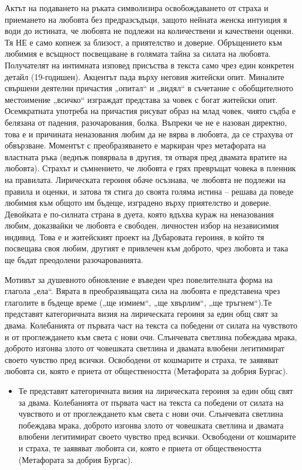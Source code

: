 \documentclass[12pt,a4paper]{article}
\begin{document}
\indent Актът на подаването на ръката символизира освобождаването от страха и приемането на любовта без предразсъдъци, защото нейната женска интуиция я води до истината, че любовта не подлежи на количествени и качествени оценки. Тя НЕ е само копнеж за близост, а приятелство и доверие. Обръщението към любимия е всъщност посвещаване в голямата тайна за силата на любовта. Получателят на интимната изповед присъства в текста само чрез един конкретен детайл (19-годишен). Акцентът пада върху неговия житейски опит. Миналите свършени деятелни причастия „опитал“ и „видял“ в съчетание с обобщителното местоимение „всичко“ изграждат представа за човек с богат житейски опит. Осемкратната употреба на причастия рисуват образ на млад човек, чиято съдба е белязана от падения, разочарования, болка. Въпреки че не е назован директно, това е и причината неназования любим да не вярва в любовта, да се страхува от обвързване. Моментът с преобразяването е маркиран чрез метафората на властната ръка (веднъж повярвала в другия, тя отваря пред двамата вратите на любовта). Страхът и съмнението, че любовта е грях превръщат човека в пленник на правилата. Лирическата героиня обаче осъзнава, че любовта не подлежи на правила и оценки, и затова тя стига до своята голяма истина – решава да поведе любимия към общото им бъдеще, изградено върху приятелство и доверие. Девойката е по-силната страна в дуета, която вдъхва кураж на неназования любим, доказвайки че любовта е свободен, личностен избор на независимия индивид. Това е и житейският проект на Дубаровата героиня, в който тя посвещава своя любим, другият е привлечен към доброто, чрез любовта и така ще бъдат преодолени разочарованията.

\vspace{0.1cm}
 
\indent Мотивът за душевното обновление е въведен чрез повелителната форма на глагола „ела“. Вярата в преобразяващата сила на любовта е представена чрез глаголите в бъдеще време („ще измием“, „ще хвърлим“, „ще тръгнем“).Те представят категоричната визия на лирическата героиня за един общ свят за двама. Колебанията от първата част на текста са победени от силата на чувството и от проглеждането към света с нови очи. Слънчевата светлина побеждава мрака, доброто изгонва злото от човешката светлина и двамата влюбени легитимират своето чувство пред всички. Освободени от кошмарите и страха, те заявяват любовта си, която е приета от обществеността (Метафората за добрия Бургас). 

\begin{itemize}[leftmargin=*]
\vspace{-0.2cm}
\item Те представят категоричната визия на лирическата героиня за един общ свят за двама. Колебанията от първата част на текста са победени от силата на чувството и от проглеждането към света с нови очи. Слънчевата светлина побеждава мрака, доброто изгонва злото от човешката светлина и двамата влюбени легитимират своето чувство пред всички. Освободени от кошмарите и страха, те заявяват любовта си, която е приета от обществеността (Метафората за добрия Бургас). 
\end{itemize}
\end{document}
